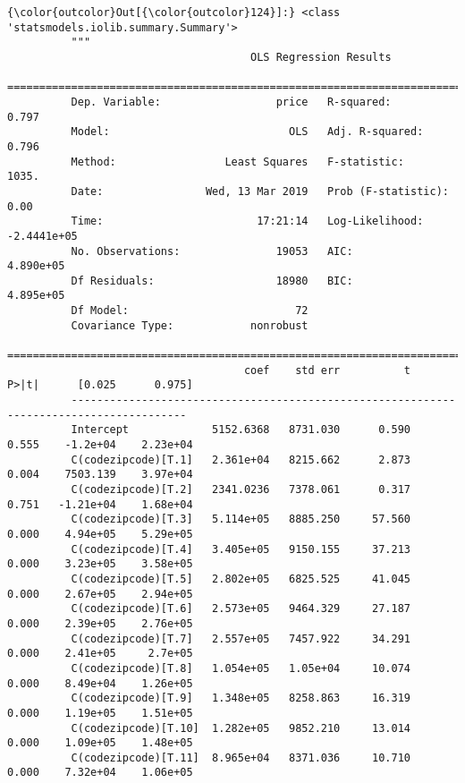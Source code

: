 \documentclass[11pt]{article}
\begin{document}
\begin{Verbatim}[commandchars=\\\{\}]
{\color{outcolor}Out[{\color{outcolor}124}]:} <class 'statsmodels.iolib.summary.Summary'>
          """
                                      OLS Regression Results                            
          ==============================================================================
          Dep. Variable:                  price   R-squared:                       0.797
          Model:                            OLS   Adj. R-squared:                  0.796
          Method:                 Least Squares   F-statistic:                     1035.
          Date:                Wed, 13 Mar 2019   Prob (F-statistic):               0.00
          Time:                        17:21:14   Log-Likelihood:            -2.4441e+05
          No. Observations:               19053   AIC:                         4.890e+05
          Df Residuals:                   18980   BIC:                         4.895e+05
          Df Model:                          72                                         
          Covariance Type:            nonrobust                                         
          ========================================================================================
                                     coef    std err          t      P>|t|      [0.025      0.975]
          ----------------------------------------------------------------------------------------
          Intercept             5152.6368   8731.030      0.590      0.555    -1.2e+04    2.23e+04
          C(codezipcode)[T.1]   2.361e+04   8215.662      2.873      0.004    7503.139    3.97e+04
          C(codezipcode)[T.2]   2341.0236   7378.061      0.317      0.751   -1.21e+04    1.68e+04
          C(codezipcode)[T.3]   5.114e+05   8885.250     57.560      0.000    4.94e+05    5.29e+05
          C(codezipcode)[T.4]   3.405e+05   9150.155     37.213      0.000    3.23e+05    3.58e+05
          C(codezipcode)[T.5]   2.802e+05   6825.525     41.045      0.000    2.67e+05    2.94e+05
          C(codezipcode)[T.6]   2.573e+05   9464.329     27.187      0.000    2.39e+05    2.76e+05
          C(codezipcode)[T.7]   2.557e+05   7457.922     34.291      0.000    2.41e+05     2.7e+05
          C(codezipcode)[T.8]   1.054e+05   1.05e+04     10.074      0.000    8.49e+04    1.26e+05
          C(codezipcode)[T.9]   1.348e+05   8258.863     16.319      0.000    1.19e+05    1.51e+05
          C(codezipcode)[T.10]  1.282e+05   9852.210     13.014      0.000    1.09e+05    1.48e+05
          C(codezipcode)[T.11]  8.965e+04   8371.036     10.710      0.000    7.32e+04    1.06e+05

\end{Verbatim}
\end{document}
